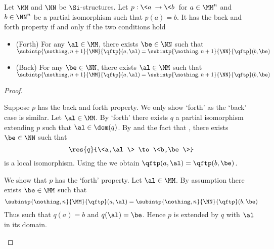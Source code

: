 \begin{prop}
    Let $\MM$ and $\NN$ be $\Si$-structures.
    Let $p : \<a\> \to \<b\>$ for $a \in \MM^n$ and $b \in \NN^n$
    be a partial isomorphism such that $p(a) = b$.
    It has the back and forth property if and only if the two conditions hold
    \begin{itemize}
        \item (Forth) For any $\al \in \MM$, 
            there exists $\be \in \NN$ such that 
            $\subintp{\nothing,n+1}{\MM}{\qftp}(a,\al) = 
            \subintp{\nothing,n+1}{\NN}{\qftp}(b,\be)$
        \item (Back) For any $\be \in \NN$, 
        there exists $\al \in \MM$ such that 
        $\subintp{\nothing,n+1}{\MM}{\qftp}(a,\al) = 
        \subintp{\nothing,n+1}{\NN}{\qftp}(b,\be)$
    \end{itemize}
\end{prop}
\begin{proof}
    \begin{forward}
        Suppose $p$ has the back and forth property.
        We only show `forth' as the `back' case is similar.
        Let $\al \in \MM$.
        By `forth' there exists $q$ 
        a partial isomorphism extending $p$ such that 
        $\al \in \dom(q)$.
        By 
        and the fact that ,
        there exists $\be \in \NN$ such that 
        \[\res{q}{\<a,\al\> \to \<b,\be\>}\]
        is a local isomorphism.
        Using the 
        we obtain ${\qftp}(a,\al) = {\qftp}(b,\be)$.
    \end{forward}

    \begin{backward}
        We show that $p$ has the `forth' property.
        Let $\al \in \MM$.
        By assumption there exists $\be \in \MM$ such that 
        \[\subintp{\nothing,n}{\MM}{\qftp}(a,\al) = 
        \subintp{\nothing,n}{\NN}{\qftp}(b,\be)\]
        Thus  such that $q(a) = b$ and $q(\al) = \be$.
        Hence $p$ is extended by $q$ with $\al$ in its domain.
    \end{backward}
\end{proof}

